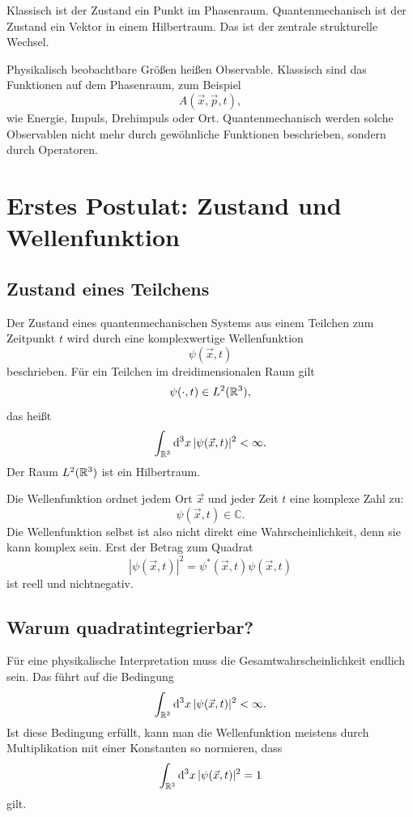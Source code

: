 \begin{conceptbox}
Klassisch ist der Zustand ein Punkt im Phasenraum. Quantenmechanisch ist der Zustand ein Vektor in einem Hilbertraum. Das ist der zentrale strukturelle Wechsel.
\end{conceptbox}

Physikalisch beobachtbare Größen heißen Observable. Klassisch sind das Funktionen auf dem Phasenraum, zum Beispiel
\[
    A(\vec{x},\vec{p},t),
\]
wie Energie, Impuls, Drehimpuls oder Ort. Quantenmechanisch werden solche Observablen nicht mehr durch gewöhnliche Funktionen beschrieben, sondern durch Operatoren.

\section{Erstes Postulat: Zustand und Wellenfunktion}

\subsection{Zustand eines Teilchens}

\begin{definitionbox}
Der Zustand eines quantenmechanischen Systems aus einem Teilchen zum Zeitpunkt $t$ wird durch eine komplexwertige Wellenfunktion
\[
    \psi(\vec{x},t)
\]
beschrieben. Für ein Teilchen im dreidimensionalen Raum gilt
\[
    \psi(\cdot,t)\in L^2(\mathbb{R}^3),
\]
das heißt
\[
    \int_{\mathbb{R}^3}\mathrm{d}^3x\,|\psi(\vec{x},t)|^2<\infty.
\]
Der Raum $L^2(\mathbb{R}^3)$ ist ein Hilbertraum.
\end{definitionbox}

Die Wellenfunktion ordnet jedem Ort $\vec{x}$ und jeder Zeit $t$ eine komplexe Zahl zu:
\[
    \psi(\vec{x},t)\in\mathbb{C}.
\]
Die Wellenfunktion selbst ist also nicht direkt eine Wahrscheinlichkeit, denn sie kann komplex sein. Erst der Betrag zum Quadrat
\[
    |\psi(\vec{x},t)|^2=\psi^*(\vec{x},t)\psi(\vec{x},t)
\]
ist reell und nichtnegativ.

\subsection{Warum quadratintegrierbar?}

Für eine physikalische Interpretation muss die Gesamtwahrscheinlichkeit endlich sein. Das führt auf die Bedingung
\[
    \int_{\mathbb{R}^3}\mathrm{d}^3x\,|\psi(\vec{x},t)|^2<\infty.
\]
Ist diese Bedingung erfüllt, kann man die Wellenfunktion meistens durch Multiplikation mit einer Konstanten so normieren, dass
\[
    \int_{\mathbb{R}^3}\mathrm{d}^3x\,|\psi(\vec{x},t)|^2=1
\]
gilt.

